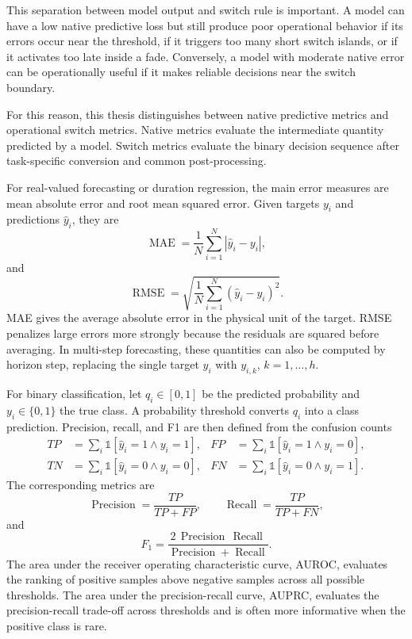 This separation between model output and switch rule is important. A model can
have a low native predictive loss but still produce poor operational behavior
if its errors occur near the threshold, if it triggers too many short switch
islands, or if it activates too late inside a fade. Conversely, a model with
moderate native error can be operationally useful if it makes reliable decisions
near the switch boundary.

For this reason, this thesis distinguishes between native predictive metrics and
operational switch metrics. Native metrics evaluate the intermediate quantity
predicted by a model. Switch metrics evaluate the binary decision sequence after
task-specific conversion and common post-processing.

For real-valued forecasting or duration regression, the main error measures are
mean absolute error and root mean squared error. Given targets \(y_i\) and
predictions \(\widehat{y}_i\), they are
\[
  \operatorname{MAE}
  =
  \frac{1}{N}
  \sum_{i=1}^{N}
  \left|\widehat{y}_i-y_i\right|,
\]
and
\[
  \operatorname{RMSE}
  =
  \sqrt{
  \frac{1}{N}
  \sum_{i=1}^{N}
  \left(\widehat{y}_i-y_i\right)^2
  } .
\]
MAE gives the average absolute error in the physical unit of the target. RMSE
penalizes large errors more strongly because the residuals are squared before
averaging. In multi-step forecasting, these quantities can also be computed by
horizon step, replacing the single target \(y_i\) with
\(y_{i,k}\), \(k=1,\ldots,h\).

For binary classification, let \(q_i\in[0,1]\) be the predicted probability and
\(y_i\in\{0,1\}\) the true class. A probability threshold converts \(q_i\) into a
class prediction. Precision, recall, and F1 are then defined from the confusion
counts
\[
\begin{aligned}
  TP &= \sum_i \mathbb{1}[\widehat{y}_i=1 \land y_i=1], &
  FP &= \sum_i \mathbb{1}[\widehat{y}_i=1 \land y_i=0], \\
  TN &= \sum_i \mathbb{1}[\widehat{y}_i=0 \land y_i=0], &
  FN &= \sum_i \mathbb{1}[\widehat{y}_i=0 \land y_i=1].
\end{aligned}
\]
The corresponding metrics are
\[
  \operatorname{Precision}=\frac{TP}{TP+FP},
  \qquad
  \operatorname{Recall}=\frac{TP}{TP+FN},
\]
and
\[
  F_1
  =
  \frac{
    2\,\operatorname{Precision}\,\operatorname{Recall}
  }{
    \operatorname{Precision}+\operatorname{Recall}
  } .
\]
The area under the receiver operating characteristic curve, AUROC, evaluates
the ranking of positive samples above negative samples across all possible
thresholds. The area under the precision-recall curve, AUPRC, evaluates the
precision-recall trade-off across thresholds and is often more informative when
the positive class is rare.

